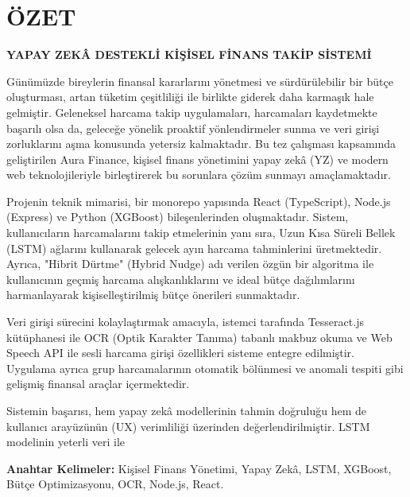 \chapter*{ÖZET}\label{ch:ozet}

\begin{center}
{\large \textbf{YAPAY ZEKÂ DESTEKLİ KİŞİSEL FİNANS TAKİP SİSTEMİ}}
\end{center}
\vspace{1cm}

Günümüzde bireylerin finansal kararlarını yönetmesi ve sürdürülebilir bir bütçe oluşturması, artan tüketim çeşitliliği ile birlikte giderek daha karmaşık hale gelmiştir. Geleneksel harcama takip uygulamaları, harcamaları kaydetmekte başarılı olsa da, geleceğe yönelik proaktif yönlendirmeler sunma ve veri girişi zorluklarını aşma konusunda yetersiz kalmaktadır. Bu tez çalışması kapsamında geliştirilen Aura Finance, kişisel finans yönetimini yapay zekâ (YZ) ve modern web teknolojileriyle birleştirerek bu sorunlara çözüm sunmayı amaçlamaktadır.

Projenin teknik mimarisi, bir monorepo yapısında React (TypeScript), Node.js (Express) ve Python (XGBoost) bileşenlerinden oluşmaktadır. Sistem, kullanıcıların harcamalarını takip etmelerinin yanı sıra, Uzun Kısa Süreli Bellek (LSTM) ağlarını kullanarak gelecek ayın harcama tahminlerini üretmektedir. Ayrıca, "Hibrit Dürtme" (Hybrid Nudge) adı verilen özgün bir algoritma ile kullanıcının geçmiş harcama alışkanlıklarını ve ideal bütçe dağılımlarını harmanlayarak kişiselleştirilmiş bütçe önerileri sunmaktadır.

Veri girişi sürecini kolaylaştırmak amacıyla, istemci tarafında Tesseract.js kütüphanesi ile OCR (Optik Karakter Tanıma) tabanlı makbuz okuma ve Web Speech API ile sesli harcama girişi özellikleri sisteme entegre edilmiştir. Uygulama ayrıca grup harcamalarının otomatik bölünmesi ve anomali tespiti gibi gelişmiş finansal araçlar içermektedir.

Sistemin başarısı, hem yapay zekâ modellerinin tahmin doğruluğu hem de kullanıcı arayüzünün (UX) verimliliği üzerinden değerlendirilmiştir. LSTM modelinin yeterli veri ile %

\textbf{Anahtar Kelimeler:} Kişisel Finans Yönetimi, Yapay Zekâ, LSTM, XGBoost, Bütçe Optimizasyonu, OCR, Node.js, React.
